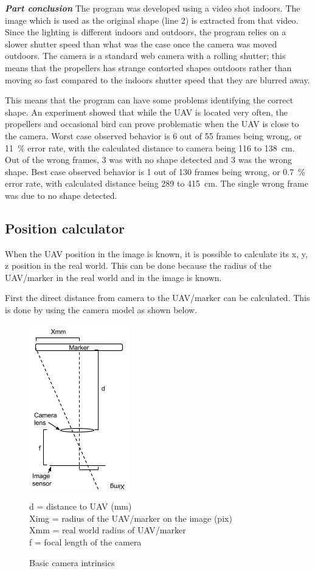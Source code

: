 \emph{\textbf{Part conclusion}}
The program was developed using a video shot indoors. The image which is used as the original shape (line 2) is extracted from that video. Since the lighting is different indoors and outdoors, the program relies on a slower shutter speed than what was the case once the camera was moved outdoors. The camera is a standard web camera with a rolling shutter; this means that the propellers has strange contorted shapes outdoors rather than moving so fast compared to the indoors shutter speed that they are blurred away. 

This means that the program can have some problems identifying the correct shape. An experiment showed that while the UAV is located very often, the propellers and occasional bird can prove problematic when the UAV is close to the camera. Worst case observed behavior is 6 out of 55 frames being wrong, or \SI{11}{\percent} error rate, with the calculated distance to camera being 116 to \SI{138}{\centi\meter}. Out of the wrong frames, 3 was with no shape detected and 3 was the wrong shape. Best case observed behavior is 1 out of 130 frames being wrong, or \SI{0.7}{\percent} error rate, with calculated distance being 289 to \SI{415}{\centi\meter}. The single wrong frame was due to no shape detected.
\subsection{Position calculator}
When the UAV position in the image is known, it is possible to calculate its x, y, z position in the real world. This can be done because the radius of the UAV/marker in the real world and in the image is known. 

First the direct distance from camera to the UAV/marker can be calculated. This is done by using the camera model as shown below.
\begin{figure}[h!]
	\centering
	\includegraphics{imgs/focal_length}\\
	\caption{Basic camera intrinsics}
	d = distance to UAV (\si{\milli\meter})\\
	Ximg = radius of the UAV/marker on the image (pix)\\
	Xmm = real world radius of UAV/marker\\
	f = focal length of the camera
\end{figure}

